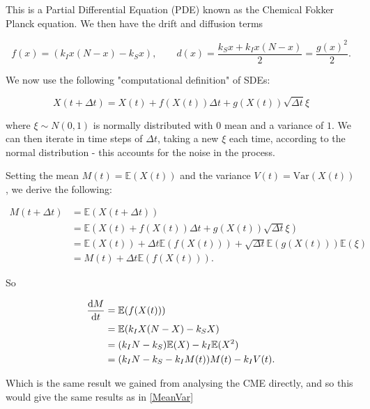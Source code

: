 \documentclass[12pt,a4paper,openany,twoside]{book}
\renewcommand{\d}{{\mathrm d}}
\newcommand{\fd}[2]{\mathchoice{\frac{\d #1}{\d #2}}{\d #1/\d #2}{\d #1/\d #2}{\d #1/\d #2}}
\begin{document}
This is a Partial Differential Equation (PDE) known as the Chemical Fokker Planck equation. We then have the drift and diffusion terms

\begin{equation}
	f(x) = (k_I x (N-x) - k_S x), \qquad d(x) = \frac {k_S x + k_I x (N-x)} {2} = \frac {g(x)^2} 2.
\end{equation}

We now use the following "computational definition" of SDEs:

\begin{equation}
	X(t + \Delta t) = X(t) + f(X(t)) \Delta t + g(X(t)) \sqrt{\Delta t} \xi
\end{equation}

where $\xi \sim N(0, 1)$ is normally distributed with $0$ mean and a variance of $1$. We can then iterate in time steps of $\Delta t$, taking a new $\xi$ each time, according to the normal distribution - this accounts for the noise in the process.

Setting the mean $M(t) = \mathbb{E} (X(t))$ and the variance $V(t) = \mathrm{Var} (X(t))$, we derive the following:

\begin{equation}
\begin{aligned}
	M(t + \Delta t) &= \mathbb{E} (X(t + \Delta t)) \\
	&= \mathbb{E} (X(t) + f(X(t)) \Delta t + g(X(t)) \sqrt{\Delta t} \xi) \\
	&= \mathbb{E} (X(t)) + \Delta t \mathbb{E} (f(X(t))) + \sqrt{\Delta t}\mathbb{E} (g(X(t))) \mathbb{E} (\xi) \\
	&= M(t) + \Delta t \mathbb{E} (f(X(t))).
\end{aligned}
\end{equation}

So

\begin{equation}
\begin{aligned}
	\fd M t &= \mathbb{E} (f(X(t))) \\
	&= \mathbb{E} (k_I X (N-X) - k_S X) \\
	&= (k_I N - k_S) \mathbb{E} (X) - k_I \mathbb{E} (X^2) \\
	&= (k_I N - k_S - k_I M(t)) M(t) - k_I V(t).
\end{aligned}
\end{equation}

Which is the same result we gained from analysing the CME directly, and so this would give the same results as in \ref{MeanVar}
\end{document}
